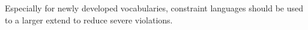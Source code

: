 \documentclass[conference]{IEEEtran}
\begin{document}
Especially for newly developed vocabularies, constraint languages should be used to a larger extend to reduce severe violations.


\end{document}
